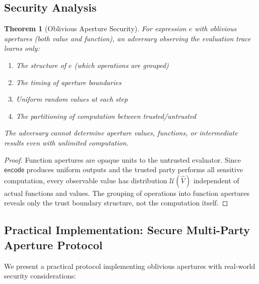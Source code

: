 \documentclass[12pt]{article}
\newtheorem{theorem}{Theorem}
\begin{document}
\subsection{Security Analysis}

\begin{theorem}[Oblivious Aperture Security]
For expression $e$ with oblivious apertures (both value and function), an adversary observing the evaluation trace learns only:
\begin{enumerate}
    \item The structure of $e$ (which operations are grouped)
    \item The timing of aperture boundaries
    \item Uniform random values at each step
    \item The partitioning of computation between trusted/untrusted
\end{enumerate}
The adversary cannot determine aperture values, functions, or intermediate results even with unlimited computation.
\end{theorem}

\begin{proof}
Function apertures are opaque units to the untrusted evaluator. Since $\mathsf{encode}$ produces uniform outputs and the trusted party performs all sensitive computation, every observable value has distribution $\mathcal{U}(\hat{V})$ independent of actual functions and values. The grouping of operations into function apertures reveals only the trust boundary structure, not the computation itself.
\end{proof}

\subsection{Practical Implementation: Secure Multi-Party Aperture Protocol}

We present a practical protocol implementing oblivious apertures with real-world security considerations:
\end{document}
